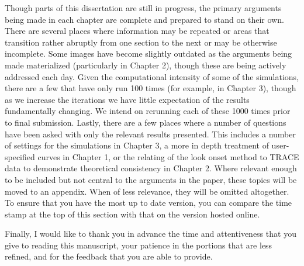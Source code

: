 Though parts of this dissertation are still in progress, the primary arguments being made in each chapter are complete and prepared to stand on their own. There are several places where information may be repeated or areas that transition rather abruptly from one section to the next or may be otherwise incomplete. Some images have become slightly outdated as the arguments being made materialized (particularly in Chapter 2), though these are being actively addressed each day. Given the computational intensity of some of the simulations, there are a few that have only run 100 times (for example, in Chapter 3), though as we increase the iterations we have little expectation of the results fundamentally changing. We intend on rerunning each of these 1000 times prior to final submission. Lastly, there are a few places where a number of questions have been asked with only the relevant results presented. This includes a number of settings for the simulations in Chapter 3, a more in depth treatment of user-specified curves in Chapter 1, or the relating of the look onset method to TRACE data to demonstrate theoretical consistency in Chapter 2. Where relevant enough to be included but not central to the arguments in the paper, these topics will be moved to an appendix. When of less relevance, they will be omitted altogether. To ensure that you have the most up to date version, you can compare the time stamp at the top of this section with that on the version hosted online.

Finally, I would like to thank you in advance the time and attentiveness that you give to reading this manuscript, your patience in the portions that are less refined, and for the feedback that you are able to provide. 
